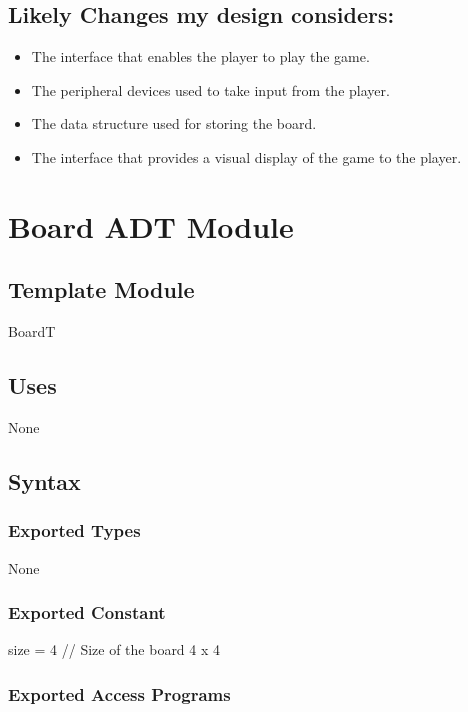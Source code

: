 \documentclass[12pt]{article}
\begin{document}
\newpage

\subsection*{Likely Changes my design considers:}

\begin{itemize}
  \item The interface that enables the player to play the game.
  \item The peripheral devices used to take input from the player.
  \item The data structure used for storing the board.
  \item The interface that provides a visual display of the game to the player.
\end{itemize}

\newpage

\section* {Board ADT Module}

\subsection*{Template Module}

BoardT

\subsection* {Uses}

None

\subsection* {Syntax}

\subsubsection* {Exported Types}

None

\subsubsection* {Exported Constant}

size = 4 \quad // Size of the board 4 x 4

\subsubsection* {Exported Access Programs}
\end{document}
